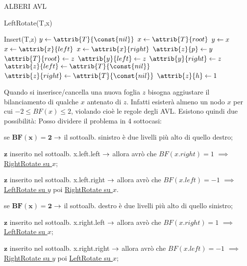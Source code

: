 \documentclass[8pt]{extarticle}
\begin{document}
\begin{formulario}
\begin{myParagraph}{ALBERI AVL}
\begin{code}{LeftRotate(T,x)}
		\end{code}
		\begin{code}{Insert(T,z)}
\li $y\get\attrib{T}{\const{nil}}$ 
\li $x\get\attrib{T}{root}$
\li {} \qquad\qquad\quad{}
	\li $y\leftarrow x$
	\li {}
		\li $x\get\attrib{x}{left}$
	\li \ELSE
		\li $x\get \attrib{x}{right}$
	\END
\END
\li $\attrib{z}{p}\get y$ 
\li {} \qquad\qquad\quad{}
	\li $\attrib{T}{root}\get z$
\li {}
	\li $\attrib{y}{left}\get z$
\li \ELSE
	\li $\attrib{y}{right}\get z$
\END
\li $\attrib{z}{left}\get\attrib{T}{\const{nil}}$
\li $\attrib{z}{right}\get\attrib{T}{\const{nil}}$
\li $\attrib{z}{h}\get 1$
\li {}
		\end{code}
Quando si inserisce/cancella una nuova foglia $z$ bisogna aggiustare il bilanciamento di qualche $x$ antenato di $z$. Infatti esisterà almeno un nodo $x$ per cui $-2\leq BF(x)\leq2$, violando cioè le regole degli AVL. Esistono quindi due possibilità:
Posso dividere il problema in 4 sottocasi:
		\begin{descr}{1}
			\item[se $\bm{BF(x)=2}$] $\rightarrow$ il sottoalb. sinistro è due livelli più alto di quello destro;
			\begin{Descr} 
				\item[$\bm{z}$ inserito nel sottoalb. x.left.left] $\rightarrow$ allora avrò che $BF(x.right)=1$ $\implies$ \underline{RightRotate su $x$};
				\item[$\bm{z}$ inserito nel sottoalb. x.left.right] $\rightarrow$ allora avrò che $BF(x.left)=-1$ $\implies$ \underline{LeftRotate su $y$} poi \underline{RightRotate su $x$}.
			\end{Descr}
			\item[se $\bm{BF(x)=2}$] $\rightarrow$ il sottoalb. destro è due livelli più alto di quello sinistro;
			\begin{Descr} 
				\item[$\bm{z}$ inserito nel sottoalb. x.right.left] $\rightarrow$ allora avrò che $BF(x.right)=1$ $\implies$\underline{LeftRotate su $x$};
				\item[$\bm{z}$ inserito nel sottoalb. x.right.right] $\rightarrow$ allora avrò che $BF(x.left)=-1$ $\implies$\underline{RightRotate su $y$} poi \underline{LeftRotate su $x$};

\end{Descr}
\end{descr}
\end{myParagraph}
\end{formulario}
\end{document}
